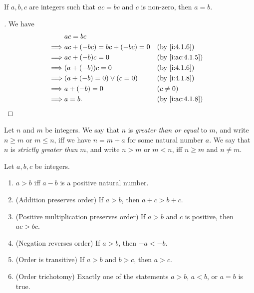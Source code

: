 \begin{cor}\label{i:4.1.9}
  If \(a, b, c\) are integers such that \(ac = bc\) and \(c\) is non-zero, then \(a = b\).
\end{cor}

\begin{proof}[]
  We have
  \begin{align*}
             & ac = bc                                          \\
    \implies & ac + (-bc) = bc + (-bc) = 0 &  & \by{i:4.1.6}    \\
    \implies & ac + (-b) c = 0             &  & \by{i:ac:4.1.5} \\
    \implies & (a + (-b)) c = 0            &  & \by{i:4.1.6}    \\
    \implies & (a + (-b) = 0) \lor (c = 0) &  & \by{i:4.1.8}    \\
    \implies & a + (-b) = 0                &  & (c \neq 0)      \\
    \implies & a = b.                      &  & \by{i:ac:4.1.8}
  \end{align*}
\end{proof}

\begin{defn}\label{i:4.1.10}
  Let \(n\) and \(m\) be integers.
  We say that \(n\) is \emph{greater than or equal} to \(m\), and write \(n \geq m\) or \(m \leq n\), iff we have \(n = m + a\) for some natural number \(a\).
  We say that \(n\) is \emph{strictly greater than} \(m\), and write \(n > m\) or \(m < n\), iff \(n \geq m\) and \(n \neq m\).
\end{defn}

\begin{lem}\label{i:4.1.11}
  Let \(a, b, c\) be integers.
  \begin{enumerate}
    \item \(a > b\) iff \(a - b\) is a positive natural number.
    \item (Addition preserves order) If \(a > b\), then \(a + c > b + c\).
    \item (Positive multiplication preserves order) If \(a > b\) and \(c\) is positive, then \(ac > bc\).
    \item (Negation reverses order) If \(a > b\), then \(-a < -b\).
    \item (Order is transitive) If \(a > b\) and \(b > c\), then \(a > c\).
    \item (Order trichotomy) Exactly one of the statements \(a > b\), \(a < b\), or \(a = b\) is true.
  \end{enumerate}
\end{lem}

